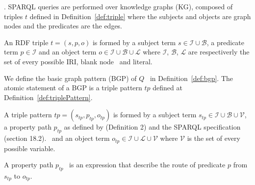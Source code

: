 .
SPARQL queries are performed over knowledge graphs (KG), composed of triples $t$ defined in Definition~\ref{def:triple} where the subjects and objects are graph nodes and the predicates are the edges.

\begin{definition}\label{def:triple}
    An RDF triple $t = (s,p,o)$ is formed by a subject term $s \in \mathcal{I} \cup \mathcal{B}$, a predicate term  $p \in \mathcal{I}$ and an object term $o \in \mathcal{I} \cup \mathcal{B} \cup \mathcal{L}$
    where $\mathcal{I}$, $\mathcal{B}$, $\mathcal{L}$ are respectiverly the set of every possible IRI, blank node~ and literal.
\end{definition}

\iffalse
We define the basic graph pattern (BGP) of $Q$~ in Definition~\ref{def:bgp}.
The atomic statement of a BGP is a triple pattern $tp$ defined at Definition~\ref{def:triplePattern}.

\begin{definition}\label{def:triplePattern}
    A triple pattern $tp = (s_{tp},p_{tp},o_{tp})$ is formed by a subject term $s_{tp} \in \mathcal{I} \cup \mathcal{B} \cup \mathcal{V}$, 
    a property path  $p_{tp}$ as defined by  \citeauthor{Kostylev2015} (Definition 2) and the SPARQL specification (section 18.2).~ 
    and an object term  $o_{tp} \in \mathcal{I} \cup \mathcal{L} \cup \mathcal{V}$ 
    where $\mathcal{V}$ is the set of every possible variable. 
\end{definition}

\begin{definition}\label{def:propertyPath}
   A property path $p_{tp}$~\cite{Kostylev2015} is an expression that describe the route of predicate $p$ from $s_{tp}$ to $o_{tp}$.
   \iffalse
   A property path in $tp$ is defined as follow:
   \begin{equation}
    p_{tp} ::= p \in \mathcal{I} | (p_{tpi}/p_{tpj}) | (p_{tpi}|p_{tpj}) | p_{tpi}* | p_{tpi}+ | p_{tpi}? | !p_{tpi}| p_{tpi}^{-}
   \end{equation}.
   The "$/$" operator chain two property path, the alternative operator "$|$" define a possibility between $p_{tpi}$ and $p_{tpj}$.
   The "$^-$" operator inverse the path from $s_{tp}$ to $o_{tp}$.
   The "$!$" represent the negation of a path $p_{tpi}$ such as $p_{tpi} = \mathcal{I} \setminus p_{tpi}$.
   The "$*$", "$+$" and "$?$", refered to in this paper as \emph{cardinality property paths}, are respectively; the repetition of 0 and more of $p_{tpi}$, 
   the repetition of 1 and more of $p_{tpi}$ and the presence or absence of $p_{tpi}$.
   \fi
\end{definition}

